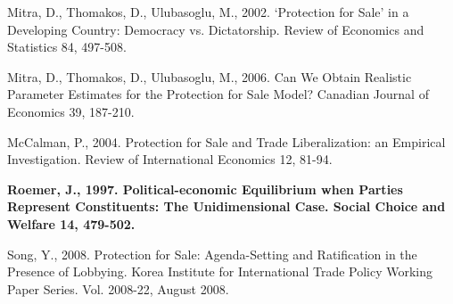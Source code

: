 \documentclass[10pt]{article}
\begin{document}
\begin{list}{}{\setlength{\leftmargin}{0.0in}\setlength{\rightmargin}{0.0in}\setlength{\itemindent}{0.0in}\setlength{\itemsep}{0.1in}}
\item Mitra, D., Thomakos, D., Ulubasoglu, M., 2002. `Protection for Sale' in a Developing Country: Democracy vs. Dictatorship. Review of Economics and Statistics 84, 497-508.

\item Mitra, D., Thomakos, D., Ulubasoglu, M., 2006. Can We Obtain Realistic Parameter Estimates for the Protection for Sale Model? Canadian Journal of Economics 39, 187-210.


\item McCalman, P., 2004. Protection for Sale and Trade Liberalization: an Empirical Investigation. Review of International Economics 12, 81-94.


\item \textbf{Roemer, J., 1997. Political-economic Equilibrium when Parties Represent Constituents: The Unidimensional Case. Social Choice and Welfare 14, 479-502.}

\item Song, Y., 2008. Protection for Sale: Agenda-Setting and Ratification in the Presence of Lobbying. Korea Institute for International Trade Policy Working Paper Series. Vol. 2008-22, August 2008.



\end{list}
\end{document}
